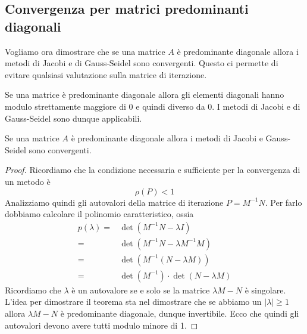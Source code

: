 \subsection{Convergenza per matrici predominanti diagonali}
Vogliamo ora dimostrare che se una matrice $A$ è predominante diagonale allora i metodi di Jacobi e di
Gauss-Seidel sono convergenti. Questo ci permette di evitare qualsiasi valutazione sulla matrice di iterazione.

Se una matrice è predominante diagonale allora gli elementi diagonali hanno modulo strettamente maggiore di 0
e quindi diverso da 0. I metodi di Jacobi e di Gauss-Seidel sono dunque applicabili.

\begin{theorem}
	Se una matrice $A$ è predominante diagonale allora i metodi di Jacobi e Gauss-Seidel sono convergenti.
	\begin{proof}
		Ricordiamo che la condizione necessaria e sufficiente per la convergenza di un metodo è
		\[ \rho(P) < 1 \]
		Analizziamo quindi gli autovalori della matrice di iterazione $P = M^{-1} N$. Per farlo dobbiamo
		calcolare il polinomio caratteristico, ossia
		\begin{align*}
			p(\lambda) = & \det(M^{-1} N - \lambda I)             \\
			=            & \det(M^{-1} N - \lambda M^{-1} M)      \\
			=            & \det(M^{-1} (N - \lambda M))           \\
			=            & \det(M^{-1}) \cdot \det(N - \lambda M)
		\end{align*}
		Ricordiamo che $\lambda$ è un autovalore se e solo se la matrice $\lambda M - N$ è singolare. L'idea
		per dimostrare il teorema sta nel dimostrare che se abbiamo un $|\lambda| \geq 1$ allora $\lambda M - N$
		è predominante diagonale, dunque invertibile. Ecco che quindi gli autovalori devono avere tutti modulo
		minore di 1.


\end{proof}
\end{theorem}
